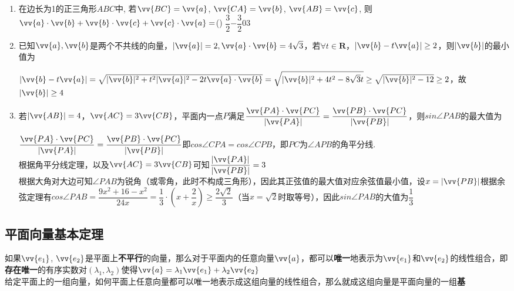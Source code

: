 \begin{enumerate}
    \item 在边长为1的正三角形$ABC$中, 若$\vv{BC}=\vv{a}$, $\vv{CA}=\vv{b}$, $\vv{AB}=\vv{c}$, 则$\vv{a}\cdot\vv{b}+\vv{b}\cdot\vv{c}+\vv{c}\cdot\vv{a}=$\dotfill()
    \xx
    {$\dfrac{3}{2}$}{$-\dfrac{3}{2}$}{0}{3}
    
    \item 已知$\vv{a}, \vv{b}$是两个不共线的向量，$|\vv{a}| = 2, \vv{a} \cdot \vv{b} = 4\sqrt{3}$，若$\forall t \in \mathbf{R}$，$|\vv{b} - t \vv{a}| \geq 2$，则$|\vv{b}|$的最小值为
    \begin{jieda}
        $|\vv{b} - t \vv{a}| = \sqrt{|\vv{b}|^2 + t^2|\vv{a}|^2 - 2t\vv{a} \cdot \vv{b}} = \sqrt{|\vv{b}|^2 + 4t^2 - 8\sqrt{3}t} \geq \sqrt{|\vv{b}|^2 -12} \geq 2$，故$|\vv{b}| \geq 4$
    \end{jieda}
    \item 若$|\vv{AB}| = 4$，$\vv{AC} = 3\vv{CB}$，平面内一点$P$满足$\dfrac{\vv{PA} \cdot \vv{PC}}{|\vv{PA}|} = \dfrac{\vv{PB} \cdot \vv{PC}}{|\vv{PB}|}$，则$sin\angle PAB$的最大值为
    \begin{jieda}
        $\dfrac{\vv{PA} \cdot \vv{PC}}{|\vv{PA}|} = \dfrac{\vv{PB} \cdot \vv{PC}}{|\vv{PB}|}$即$cos\angle CPA = cos\angle CPB$，即$PC$为$\angle APB$的角平分线. \\
        根据角平分线定理，以及$\vv{AC} = 3\vv{CB}$可知$\dfrac{|\vv{PA}|}{|\vv{PB}|} = 3$ \\
        根据大角对大边可知$\angle PAB$为锐角（或零角，此时不构成三角形），因此其正弦值的最大值对应余弦值最小值，设$x = |\vv{PB}|$根据余弦定理有$cos\angle PAB = \dfrac{9x^2 + 16 - x^2}{24x} = \dfrac{1}{3} \cdot \left(x + \dfrac{2}{x}\right) \geq \dfrac{2\sqrt{2}}{3}$（当$x = \sqrt{2}$时取等号），因此$sin\angle PAB$的大值为$\dfrac{1}{3}$
    \end{jieda}
\end{enumerate}
\subsection*{平面向量基本定理}
如果$\vv{e_1}$, $\vv{e_2}$是平面上\textbf{不平行}的向量，那么对于平面内的任意向量$\vv{a}$，都可以\textbf{唯一}地表示为$\vv{e_1}$和$\vv{e_2}$的线性组合，即\textbf{存在唯一}的有序实数对$(\lambda_1, \lambda_2)$使得$\vv{a} = \lambda_1 \vv{e_1} + \lambda_2 \vv{e_2}$ \\
给定平面上的一组向量，如何平面上任意向量都可以唯一地表示成这组向量的线性组合，那么就成这组向量是平面向量的一组\textbf{基}

